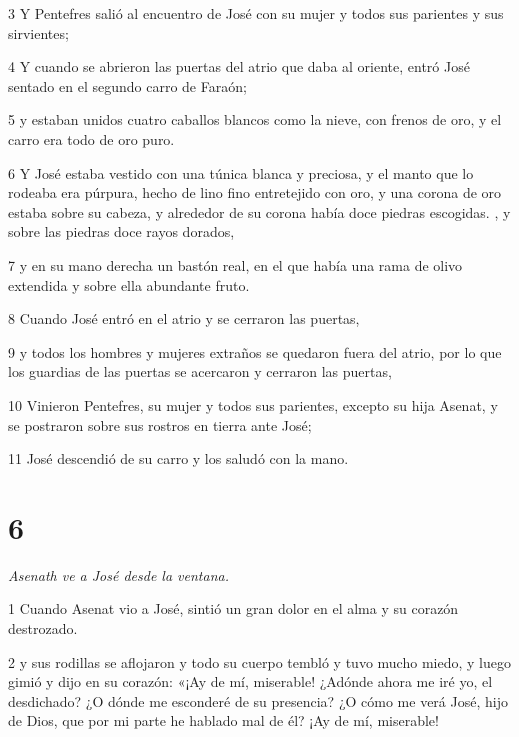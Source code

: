 \par 3 Y Pentefres salió al encuentro de José con su mujer y todos sus parientes y sus sirvientes;

\par 4 Y cuando se abrieron las puertas del atrio que daba al oriente, entró José sentado en el segundo carro de Faraón;

\par 5 y estaban unidos cuatro caballos blancos como la nieve, con frenos de oro, y el carro era todo de oro puro.

\par 6 Y José estaba vestido con una túnica blanca y preciosa, y el manto que lo rodeaba era púrpura, hecho de lino fino entretejido con oro, y una corona de oro estaba sobre su cabeza, y alrededor de su corona había doce piedras escogidas. , y sobre las piedras doce rayos dorados,

\par 7 y en su mano derecha un bastón real, en el que había una rama de olivo extendida y sobre ella abundante fruto.

\par 8 Cuando José entró en el atrio y se cerraron las puertas,

\par 9 y todos los hombres y mujeres extraños se quedaron fuera del atrio, por lo que los guardias de las puertas se acercaron y cerraron las puertas,

\par 10 Vinieron Pentefres, su mujer y todos sus parientes, excepto su hija Asenat, y se postraron sobre sus rostros en tierra ante José;

\par 11 José descendió de su carro y los saludó con la mano.

\chapter{6}

\textit{Asenath ve a José desde la ventana.}

\par 1 Cuando Asenat vio a José, sintió un gran dolor en el alma y su corazón destrozado.

\par 2 y sus rodillas se aflojaron y todo su cuerpo tembló y tuvo mucho miedo, y luego gimió y dijo en su corazón: «¡Ay de mí, miserable! ¿Adónde ahora me iré yo, el desdichado? ¿O dónde me esconderé de su presencia? ¿O cómo me verá José, hijo de Dios, que por mi parte he hablado mal de él? ¡Ay de mí, miserable!


